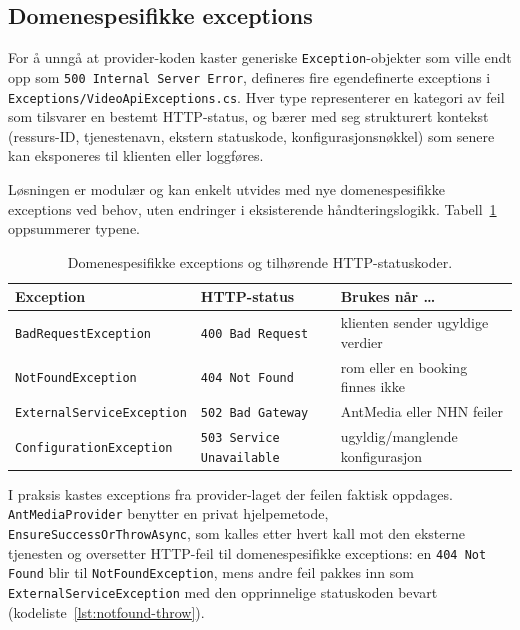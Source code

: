 \subsection{Domenespesifikke exceptions}
\label{subsec:errors-exceptions}

For å unngå at provider-koden kaster generiske \texttt{Exception}-objekter som ville endt opp som \texttt{500 Internal Server Error}, defineres fire egendefinerte exceptions i \texttt{Exceptions/VideoApiExceptions.cs}. Hver type representerer en kategori av feil som tilsvarer en bestemt HTTP-status, og bærer med seg strukturert kontekst (ressurs-ID, tjenestenavn, ekstern statuskode, konfigurasjonsnøkkel) som senere kan eksponeres til klienten eller loggføres.

Løsningen er modulær og kan enkelt utvides med nye domenespesifikke exceptions ved behov, uten endringer i eksisterende håndteringslogikk. Tabell~\ref{tab:domain-exceptions} oppsummerer typene.

\begin{table}[H]
\centering
\caption{Domenespesifikke exceptions og tilhørende HTTP-statuskoder.}
\label{tab:domain-exceptions}
\small
\begin{tabular}{l l l}
\toprule
\textbf{Exception} & \textbf{HTTP-status} & \textbf{Brukes når \dots} \\
\midrule
\texttt{BadRequestException}      & \texttt{400 Bad Request}          & klienten sender ugyldige verdier \\
\texttt{NotFoundException}        & \texttt{404 Not Found}            & rom eller en booking finnes ikke \\
\texttt{ExternalServiceException} & \texttt{502 Bad Gateway}          & AntMedia eller NHN feiler \\
\texttt{ConfigurationException}   & \texttt{503 Service Unavailable}  & ugyldig/manglende konfigurasjon \\
\bottomrule
\end{tabular}
\end{table}


I praksis kastes exceptions fra provider-laget der feilen faktisk oppdages. \texttt{AntMediaProvider} benytter en privat hjelpemetode, \texttt{EnsureSuccessOrThrowAsync}, som kalles etter hvert kall mot den eksterne tjenesten og oversetter HTTP-feil til domenespesifikke exceptions: en \texttt{404 Not Found} blir til \texttt{NotFoundException}, mens andre feil pakkes inn som \texttt{ExternalServiceException} med den opprinnelige statuskoden bevart (kodeliste~\ref{lst:notfound-throw}).

